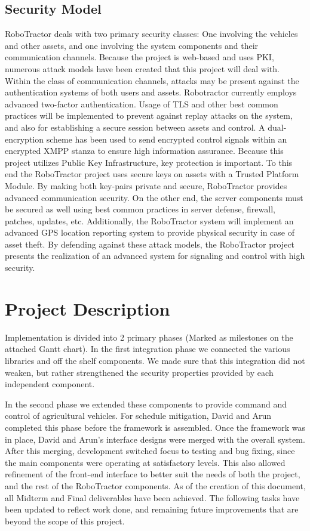 \documentclass[conference,12pt]{IEEEtran}
\begin{document}
\subsection{Security Model}
RoboTractor deals with two primary security classes: One involving the vehicles
and other assets, and one involving the system components and their
communication channels.  Because the project is web-based and uses PKI, numerous
attack models have been created that this project will deal with. Within the
class of communication channels, attacks may be present against the
authentication systems of both users and assets. Robotractor currently employs
advanced two-factor authentication. Usage of TLS and other best common practices
will be implemented to prevent against replay attacks on the system, and also
for establishing a secure session between assets and control. A dual-encryption
scheme has been used to send encrypted control signals within an encrypted XMPP
stanza to ensure high information assurance. Because this project utilizes
Public Key Infrastructure, key protection is important.  To this end the
RoboTractor project uses secure keys on assets with a Trusted Platform Module.
By making both key-pairs private and secure, RoboTractor provides advanced
communication security. On the other end, the server components must be secured
as well using best common practices in server defense, firewall, patches,
updates, etc. Additionally, the RoboTractor system will implement an advanced
GPS location reporting system to provide physical security in case of asset
theft. By defending against these attack models, the RoboTractor project
presents the realization of an advanced system for signaling and control with
high security.

\section{Project Description}
\label{sec:proj_desc}
Implementation is divided into 2 primary phases (Marked as milestones on the
attached Gantt chart). In the first integration phase we connected the various
libraries and off the shelf components. We made sure that this integration did
not weaken, but rather strengthened the security properties provided by each
independent component.

In the second phase we extended these components to provide command and control
of agricultural vehicles. For schedule mitigation, David and Arun completed this
phase before the framework is assembled. Once the framework was in place, David
and Arun's interface designs were merged with the overall system. After this
merging, development switched focus to testing and bug fixing, since the main
components were operating at satisfactory levels. This also allowed refinement
of the front-end interface to better suit the needs of both the project, and the
rest of the RoboTractor components. As of the creation of this document, all
Midterm and Final deliverables have been achieved. The following tasks have been
updated to reflect work done, and remaining future improvements that are beyond
the scope of this project.
\end{document}

